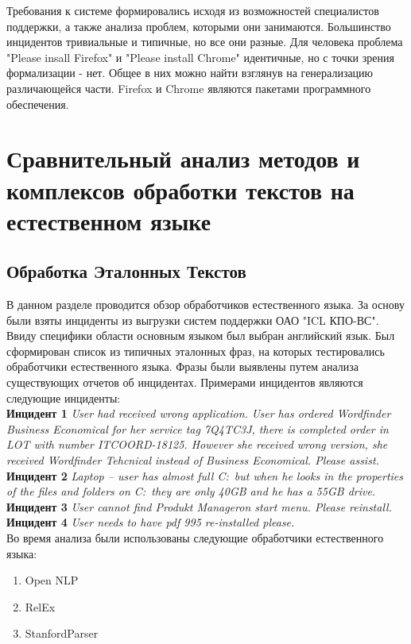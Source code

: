 Требования к системе формировались исходя из возможностей специалистов поддержки, а также анализа проблем, которыми они занимаются. Большинство инцидентов тривиальные и типичные, но все они разные. Для человека проблема "Please insall Firefox" и "Please install Chrome" идентичные, но с точки зрения формализации - нет. Общее в них можно найти взглянув на генерализацию различающейся части. Firefox и Chrome являются пакетами программного обеспечения.



\clearpage

\section{Сравнительный анализ методов и комплексов обработки текстов на естественном языке}


\subsection{Обработка Эталонных Текстов} \label{sect2_1}
В данном разделе проводится обзор обработчиков естественного языка. За основу были взяты инциденты из выгрузки систем поддержки ОАО "ICL КПО-ВС". \\
Ввиду специфики области основным языком был выбран английский язык. Был сформирован список из типичных эталонных фраз, на которых тестировались обработчики естественного языка. Фразы были выявлены путем анализа существующих отчетов об инцидентах. Примерами инцидентов являются следующие инциденты:\\
\textbf{Инцидент 1}
\textit{
User had received wrong application. User has ordered Wordfinder Business Economical for her service tag 7Q4TC3J, there is completed order in LOT with number ITCOORD-18125. However she received wrong version, she received Wordfinder Tehcnical instead of Business Economical. Please assist.
}\\
\textbf{Инцидент 2}
\textit{
Laptop – user has almost full C:\ but when he looks in the properties of the files and folders on C:\ they are only 40GB and he has a 55GB drive.
}\\
\textbf{Инцидент 3}
\textit{
User cannot find Produkt Manageron start menu. Please reinstall. 
}\\
\textbf{Инцидент 4}
\textit{
User needs to have pdf 995 re-installed please.
}\\

Во время анализа были использованы следующие обработчики естественного языка:
\begin {enumerate}
	\item{Open NLP}\cite{OpenNLP}
	\item{RelEx}\cite{OpenCogRelex}
	\item{StanfordParser}\cite{StanfordParser}
\end {enumerate}

